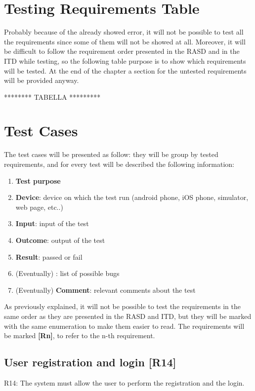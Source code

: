 \documentclass[../ATD.tex]{subfiles}
\begin{document}
    \section{Testing Requirements Table}\label{sec:testing-requirements-table}
    Probably because of the already showed error, it will not be possible to test all the requirements since some of them will not be showed at all.
    Moreover, it will be difficult to follow the requirement order presented in the RASD and in the ITD while testing, so the following table purpose is to show which requirements will be tested.
    At the end of the chapter a section for the untested requirements will be provided anyway.

    ******** TABELLA *********

    \section{Test Cases}\label{sec:test-cases}
    The test cases will be presented as follow: they will be group by tested requirements, and for every test will be described the following information:
    \begin{enumerate}
        \item \textbf{Test purpose}
        \item \textbf{Device}: device on which the test run (android phone, iOS phone, simulator, web page, etc..)
        \item \textbf{Input}: input of the test
        \item \textbf{Outcome}: output of the test
        \item \textbf{Result}: passed or fail
        \item (Eventually) : list of possible bugs
        \item (Eventually) \textbf{Comment}: relevant comments about the test
    \end{enumerate}
    As previously explained, it will not be possible to test the requirements in the same order as they are presented in the RASD and ITD,
    but they will be marked with the same enumeration to make them easier to read.
    The requirements will be marked \textbf{[Rn]}, to refer to the n-th requirement.

    \subsection{User registration and login [R14]}\label{subsec:user-registration-and-login}
    R14: The system must allow the user to perform the registration and the login.
\end{document}
